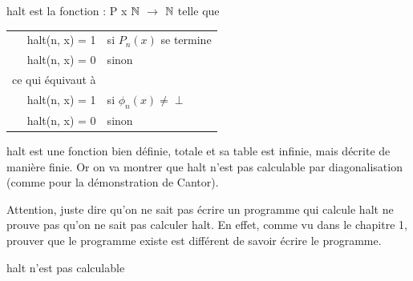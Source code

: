 \begin{mydef}[halt]
	halt est la fonction : P x $\mathbb{N}$ $\rightarrow$ $\mathbb{N}$ telle que \\
	\begin{tabular}{rl}
	  halt(n, x) = 1 & si $P_n(x)$ se termine \\
	  halt(n, x) = 0 & sinon \\
	  ce qui équivaut à &\\
	  halt(n, x) = 1 & si $\phi_n(x)\neq \perp$ \\
	  halt(n, x) = 0 & sinon \\
	\end{tabular}
\end{mydef}

\begin{myprop}
	halt est une fonction bien définie, totale et sa table est infinie, mais décrite de manière finie. Or on va montrer que halt n'est pas calculable par diagonalisation (comme pour la démonstration de Cantor).\\
\end{myprop}

\begin{myrem}
	Attention, juste dire qu'on ne sait pas écrire un programme qui calcule halt ne prouve pas qu'on ne sait pas calculer halt. En effet, comme vu dans le chapitre 1, prouver que le programme existe est différent de savoir écrire le programme.
\end{myrem}

\begin{mytheo}[halt]
	halt n'est pas calculable
\end{mytheo}

